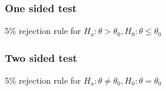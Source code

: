 \documentclass[handout]{beamer}
\begin{document}


   \begin{frame}
   \frametitle{One sided test}
   \begin{center}
   \end{center}
   {\color{blue} 5\% rejection rule} for $H_a: \theta > \theta_0, H_0:\theta \leq \theta_0$
   \end{frame}



   \begin{frame}
   \frametitle{Two sided test}
   \begin{center}
   \end{center}
   {\color{blue} 5\% rejection rule} for $H_a: \theta \neq \theta_0, H_0: \theta = \theta_0$
   \end{frame}
\end{document}
